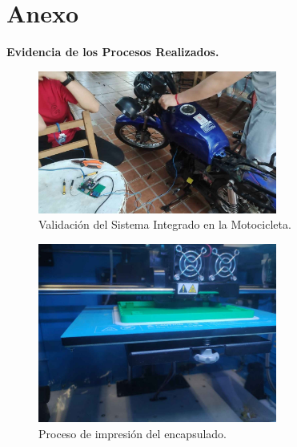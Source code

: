 \fancyhead{}
\fancyfoot{}





\chapter{Anexo}

\vspace{.5cm}
\textbf{Evidencia de los Procesos Realizados.}
\vspace{.5cm}

\begin{figure}[H]
\leavevmode
\begin{minipage}{\textwidth}
\begin{center}
\includegraphics[width=0.7\textwidth]{./capitulo_05/imagen/motocicleta.jpg}
\caption{Validación del Sistema Integrado en la Motocicleta.\label{fig:moto4}}
\end{center}
\end{minipage}
\end{figure}

\vspace{.5cm}

\begin{figure}[H]
\leavevmode
\begin{minipage}{\textwidth}
\begin{center}
\includegraphics[width=0.7\textwidth]{./anexos/imagen/impresion.jpg}
\caption{Proceso de impresión del encapsulado.\label{fig:moto1}}
\end{center}
\end{minipage}
\end{figure}

